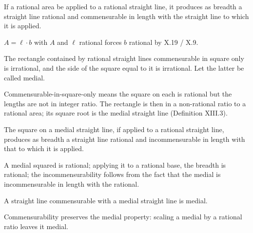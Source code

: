 \begin{claim}
\label{prop:X.20}
If a rational area be applied to a rational straight line, it produces
as breadth a straight line rational and commensurable in length with
the straight line to which it is applied.
\end{claim}
\begin{evidence}[Proof of X.20]
\label{ev:X.20}
$A = \ell \cdot b$ with $A$ and $\ell$ rational forces $b$ rational by
X.19 / X.9.
\end{evidence}

\begin{claim}
\label{prop:X.21}
The rectangle contained by rational straight lines commensurable in
square only is irrational, and the side of the square equal to it is
irrational.  Let the latter be called medial.
\end{claim}
\begin{evidence}[Proof of X.21]
\label{ev:X.21}
Commensurable-in-square-only means the square on each is rational
but the lengths are not in integer ratio.  The rectangle is then in
a non-rational ratio to a rational area; its square root is the
medial straight line (Definition XIII.3).
\end{evidence}

\begin{claim}
\label{prop:X.22}
The square on a medial straight line, if applied to a rational
straight line, produces as breadth a straight line rational and
incommensurable in length with that to which it is applied.
\end{claim}
\begin{evidence}[Proof of X.22]
\label{ev:X.22}
A medial squared is rational; applying it to a rational base, the
breadth is rational; the incommensurability follows from the fact
that the medial is incommensurable in length with the rational.
\end{evidence}

\begin{claim}
\label{prop:X.23}
A straight line commensurable with a medial straight line is medial.
\end{claim}
\begin{evidence}[Proof of X.23]
\label{ev:X.23}
Commensurability preserves the medial property: scaling a medial by
a rational ratio leaves it medial.
\end{evidence}

